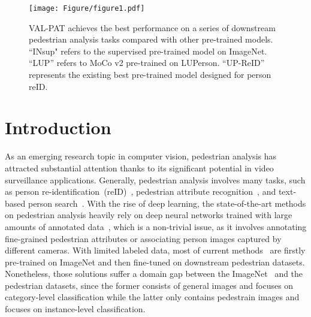 \documentclass[final]{cvpr}
\begin{document}
\begin{figure}[t]
  \centering
  \texttt{[image: Figure/figure1.pdf]}
   \caption{VAL-PAT achieves the best performance on a series of downstream pedestrian analysis tasks compared with other pre-trained models.
   ``INsup" refers to the supervised pre-trained model on ImageNet.
   ``LUP'' refers to MoCo v2 pre-trained on LUPerson.
   ``UP-ReID'' represents the existing best pre-trained model designed for person reID.
}
   \label{fig1} 
   \vspace{-3mm}
\end{figure}
\section{Introduction}
\label{sec:intro}
As an emerging research topic in computer vision, pedestrian analysis has attracted substantial attention thanks to its significant potential in video surveillance applications.
Generally, pedestrian analysis involves many tasks, 
such as person re-identification~(reID)~\cite{zhao2017spindle, zhao2017deeply, sun2018beyond, yao2019deep}, pedestrian attribute recognition~\cite{tang2019improving, jia2021rethinking, jia2021spatial}, and text-based person search~\cite{li2017person, sarafianos2019adversarial, shao2022learning, suo2022simple}.
With the rise of deep learning, the state-of-the-art methods on pedestrian analysis heavily rely on deep neural networks trained with large amounts of annotated data~\cite{wei2018person,li2016richly,liu2017hydraplus,li2017person},
which is a non-trivial issue, 
as it involves annotating fine-grained pedestrian attributes or associating person images captured by different cameras.
With limited labeled data, most of current methods~\cite{sun2018beyond,he2021transreid,yao2019deep,dai2019batch} are firstly pre-trained on ImageNet and then fine-tuned on downstream pedestrian datasets.
Nonetheless, those solutions suffer a domain gap between the ImageNet~\cite{deng2009imagenet} and the pedestrian datasets, since the former consists of general images and focuses on category-level classification while the latter only contains pedestrain images and focuses on instance-level classification.
\end{document}
